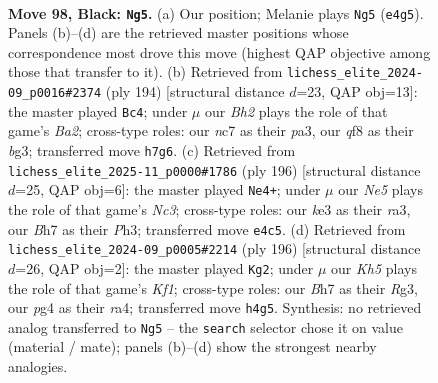 \documentclass[11pt]{article}
\begin{document}
\clearpage

\begin{figure}[p]\centering
\begin{subfigure}{0.46\textwidth}\centering
\resizebox{\linewidth}{!}{%
\newchessgame
\chessboard[
  setfen={5Q2/2N4b/8/8/1pB1n1Pk/4K3/8/8 b - - 2 98},
  showmover=false,
  pgfstyle=straightmove, color=movearrow, markmove={e4-g5}
]}
\caption{}
\end{subfigure}\hfill
\begin{subfigure}{0.46\textwidth}\centering
\resizebox{\linewidth}{!}{%
\newchessgame
\chessboard[
  setfen={8/1k6/1P6/1Kp5/8/p5b1/B7/8 w - - 5 98},
  showmover=false,
  pgfstyle=straightmove, color=movearrow, markmove={a2-c4}
]}
\caption{}
\end{subfigure}
\\[4pt]
\begin{subfigure}{0.46\textwidth}\centering
\resizebox{\linewidth}{!}{%
\newchessgame
\chessboard[
  setfen={2B5/8/8/2k4b/5p1p/r1N4P/5K2/8 w - - 6 99},
  showmover=false,
  pgfstyle=straightmove, color=movearrow, markmove={c3-e4}
]}
\caption{}
\end{subfigure}\hfill
\begin{subfigure}{0.46\textwidth}\centering
\resizebox{\linewidth}{!}{%
\newchessgame
\chessboard[
  setfen={8/4k1N1/8/7p/r6P/6R1/8/5K2 w - - 5 99},
  showmover=false,
  pgfstyle=straightmove, color=movearrow, markmove={f1-g2}
]}
\caption{}
\end{subfigure}
\caption{\textbf{Move 98, Black: \texttt{Ng5}.} (a) Our position; Melanie plays \texttt{Ng5} (\texttt{e4g5}). Panels (b)--(d) are the retrieved master positions whose correspondence most drove this move (highest QAP objective among those that transfer to it). (b) Retrieved from \texttt{lichess\_elite\_2024-09\_p0016\#2374} (ply 194) [structural distance $d$=23, QAP obj=13]: the master played \texttt{Bc4}; under $\mu$ our \emph{Bh2} plays the role of that game's \emph{Ba2}; cross-type roles: our \emph{n}c7 as their \emph{p}a3, our \emph{q}f8 as their \emph{b}g3; transferred move \texttt{h7g6}. (c) Retrieved from \texttt{lichess\_elite\_2025-11\_p0000\#1786} (ply 196) [structural distance $d$=25, QAP obj=6]: the master played \texttt{Ne4+}; under $\mu$ our \emph{Ne5} plays the role of that game's \emph{Nc3}; cross-type roles: our \emph{k}e3 as their \emph{r}a3, our \emph{B}h7 as their \emph{P}h3; transferred move \texttt{e4c5}. (d) Retrieved from \texttt{lichess\_elite\_2024-09\_p0005\#2214} (ply 196) [structural distance $d$=26, QAP obj=2]: the master played \texttt{Kg2}; under $\mu$ our \emph{Kh5} plays the role of that game's \emph{Kf1}; cross-type roles: our \emph{B}h7 as their \emph{R}g3, our \emph{p}g4 as their \emph{r}a4; transferred move \texttt{h4g5}. Synthesis: no retrieved analog transferred to \texttt{Ng5} -- the \texttt{search} selector chose it on value (material / mate); panels (b)--(d) show the strongest nearby analogies.}
\label{fig:thought-m195}
\end{figure}
\end{document}
